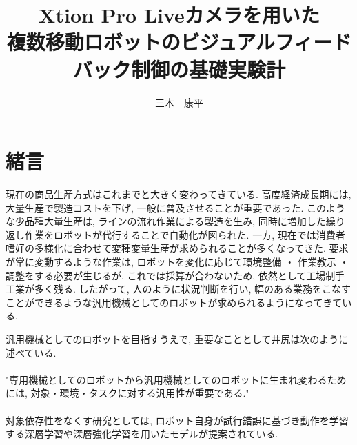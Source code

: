 \documentclass{suribt}
\title{\huge Xtion Pro Liveカメラを用いた\\複数移動ロボットのビジュアルフィードバック制御の基礎実験計}
\author{三木　康平}
\begin{document}
\maketitle %
\frontmatter %
\begin{abstract}%




\end{abstract}
\tableofcontents%
\mainmatter%
\chapter{緒言}
現在の商品生産方式はこれまでと大きく変わってきている. 高度経済成長期には, 大量生産で製造コストを下げ, 一般に普及させることが重要であった. このような少品種大量生産は, ラインの流れ作業による製造を生み, 同時に増加した繰り返し作業をロボットが代行することで自動化が図られた. 一方, 現在では消費者嗜好の多様化に合わせて変種変量生産が求められることが多くなってきた. 要求が常に変動するような作業は, ロボットを変化に応じて環境整備 ・ 作業教示 ・ 調整をする必要が生じるが, これでは採算が合わないため, 依然として工場制手工業が多く残る. したがって, 人のように状況判断を行い, 幅のある業務をこなすことができるような汎用機械としてのロボットが求められるようになってきている. 

汎用機械としてのロボットを目指すうえで, 重要なこととして井尻は次のように述べている.\\\\
"専用機械としてのロボットから汎用機械としてのロボットに生まれ変わるためには, 対象・環境・タスクに対する汎用性が重要である."\\\\
対象依存性をなくす研究としては, ロボット自身が試行錯誤に基づき動作を学習する深層学習や深層強化学習を用いたモデルが提案されている.


\end{document}
